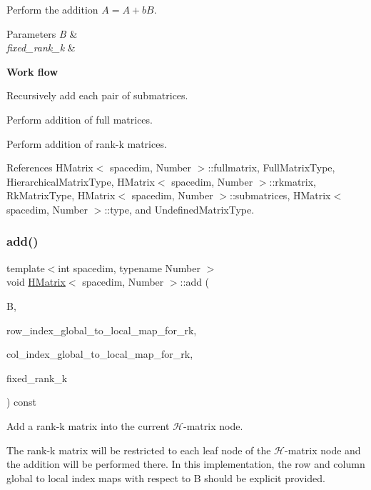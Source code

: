 Perform the addition $A = A + b B$. 
\begin{DoxyParams}{Parameters}
{\em B} & \\
\hline
{\em fixed\+\_\+rank\+\_\+k} & \\
\hline
\end{DoxyParams}
{\bfseries Work flow}

Recursively add each pair of submatrices.

Perform addition of full matrices.

Perform addition of rank-\/k matrices.

References H\+Matrix$<$ spacedim, Number $>$\+::fullmatrix, Full\+Matrix\+Type, Hierarchical\+Matrix\+Type, H\+Matrix$<$ spacedim, Number $>$\+::rkmatrix, Rk\+Matrix\+Type, H\+Matrix$<$ spacedim, Number $>$\+::submatrices, H\+Matrix$<$ spacedim, Number $>$\+::type, and Undefined\+Matrix\+Type.

\mbox{\label{classHMatrix_a1793dff400aeae649f909d7f45db8b8a}} 
\subsubsection{\texorpdfstring{add()}{add()}\hspace{0.1cm}{\footnotesize\ttfamily [5/10]}}
{\footnotesize\ttfamily template$<$int spacedim, typename Number $>$ \\
void \hyperlink{classHMatrix}{H\+Matrix}$<$ spacedim, Number $>$\+::add (\begin{DoxyParamCaption}\item[{const \hyperlink{classRkMatrix}{Rk\+Matrix}$<$ Number $>$ \&}]{B,  }\item[{const std\+::map$<$ types\+::global\+\_\+dof\+\_\+index, size\+\_\+t $>$ \&}]{row\+\_\+index\+\_\+global\+\_\+to\+\_\+local\+\_\+map\+\_\+for\+\_\+rk,  }\item[{const std\+::map$<$ types\+::global\+\_\+dof\+\_\+index, size\+\_\+t $>$ \&}]{col\+\_\+index\+\_\+global\+\_\+to\+\_\+local\+\_\+map\+\_\+for\+\_\+rk,  }\item[{const \hyperlink{classHMatrix_a5ca8dc549783d38371a01ecd621ecb34}{size\+\_\+type}}]{fixed\+\_\+rank\+\_\+k }\end{DoxyParamCaption}) const}

Add a rank-\/k matrix into the current $\mathcal{H}$-\/matrix node.

The rank-\/k matrix will be restricted to each leaf node of the $\mathcal{H}$-\/matrix node and the addition will be performed there. In this implementation, the row and column global to local index maps with respect to {\ttfamily B} should be explicit provided.


